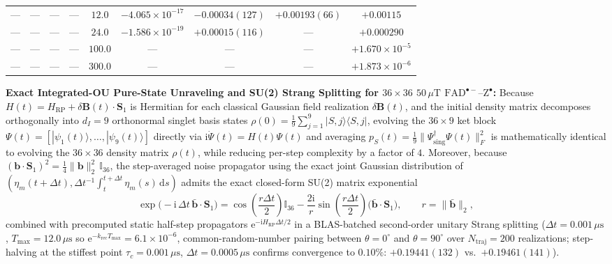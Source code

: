 \documentclass[onecolumn,10pt,notitlepage,amsmath,amssymb,floatfix]{revtex4-2}
\theoremstyle{plain}
\theoremstyle{definition}
\newcommand{\dd}{\mathrm{d}}
\newcommand{\ii}{\mathrm{i}}
\newcommand{\ee}{\mathrm{e}}
\newcommand{\HRP}{H_{\mathrm{RP}}}
\begin{document}
\begin{table}[htbp]
{\begin{tabular}{@{}cccc|ccccc@{}}
---     & ---     & ---             & ---          & $12.0$ & $-4.065\times 10^{-17}$ & $-0.00034(127)$ & $+0.00193(66)$  & $+0.00115$ \\
---     & ---     & ---             & ---          & $24.0$ & $-1.586\times 10^{-19}$ & $+0.00015(116)$ & ---            & $+0.000290$ \\
---     & ---     & ---             & ---          & $100.0$ & ---                    & ---             & ---            & $+1.670\times 10^{-5}$ \\
---     & ---     & ---             & ---          & $300.0$ & ---                    & ---             & ---            & $+1.873\times 10^{-6}$ \\
\bottomrule
\end{tabular}%
}
\end{table}

\textbf{Exact Integrated-OU Pure-State Unraveling and SU(2) Strang Splitting for $36\times 36$ $50\,\mu\text{T}$ $\mathrm{FAD}^{\bullet-}\text{--}\mathrm{Z}^{\bullet}$:}
Because $H(t) = \HRP + \delta\mathbf{B}(t)\cdot\mathbf{S}_1$ is Hermitian for each classical Gaussian field realization $\delta\mathbf{B}(t)$, and the initial density matrix decomposes orthogonally into $d_I = 9$ orthonormal singlet basis states $\rho(0) = \frac{1}{9}\sum_{j=1}^9 |S,j\rangle\langle S,j|$, evolving the $36\times 9$ ket block $\Psi(t) = [|\psi_1(t)\rangle, \dots, |\psi_9(t)\rangle]$ directly via $\ii\dot{\Psi}(t) = H(t)\Psi(t)$ and averaging $p_S(t) = \frac{1}{9}\|\Psi_{\mathrm{sing}}^\dagger \Psi(t)\|_F^2$ is mathematically identical to evolving the $36\times 36$ density matrix $\rho(t)$, while reducing per-step complexity by a factor of $4$. Moreover, because $(\mathbf{b}\cdot\mathbf{S}_1)^2 = \frac{1}{4}\|\mathbf{b}\|_2^2\,\mathbb{I}_{36}$, the step-averaged noise propagator using the exact joint Gaussian distribution of $(\eta_m(t+\Delta t), \Delta t^{-1}\!\int_t^{t+\Delta t}\eta_m(s)\,\dd s)$ admits the exact closed-form SU(2) matrix exponential
\begin{equation}
\label{eq:S4_su2_exp}
\exp\!\big(-\ii\,\Delta t\,\bar{\mathbf{b}}\cdot\mathbf{S}_1\big)
= \cos\!\left(\frac{r\Delta t}{2}\right)\mathbb{I}_{36} - \frac{2\ii}{r}\sin\!\left(\frac{r\Delta t}{2}\right)\big(\bar{\mathbf{b}}\cdot\mathbf{S}_1\big), \qquad r = \|\bar{\mathbf{b}}\|_2,
\end{equation}
combined with precomputed static half-step propagators $\ee^{-\ii\HRP\Delta t/2}$ in a BLAS-batched second-order unitary Strang splitting ($\Delta t = 0.001\,\mu\text{s}$, $T_{\max} = 12.0\,\mu\text{s}$ so $\ee^{-k_{\mathrm{rec}}T_{\max}} = 6.1\times 10^{-6}$, common-random-number pairing between $\theta=0^\circ$ and $\theta=90^\circ$ over $N_{\mathrm{traj}} = 200$ realizations; step-halving at the stiffest point $\tau_c = 0.001\,\mu\text{s}$, $\Delta t = 0.0005\,\mu\text{s}$ confirms convergence to $0.10\%$: $+0.19441(132)$ vs.\ $+0.19461(141)$).
\end{document}

